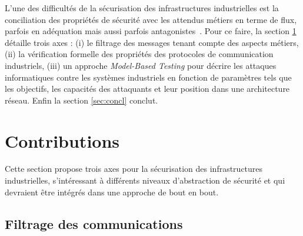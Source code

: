 \documentclass{article}
\begin{document}
L'une des difficultés de la sécurisation des infrastructures industrielles est la
conciliation des propriétés de sécurité avec les attendus métiers en terme de
flux, parfois en adéquation mais aussi parfois antagonistes~\cite{Pie10}.
Pour ce faire, la section \ref{sec:contribs} détaille trois axes :
(i) le filtrage des messages tenant compte des aspects métiers, (ii) la
vérification formelle des propriétés des protocoles de communication industriels,
(iii) un approche {\em Model-Based Testing} pour décrire les attaques
informatiques contre les systèmes industriels en fonction de paramètres tels que
les objectifs, les capacités des attaquants et leur position dans une
architecture réseau.
Enfin la section \ref{sec:concl} conclut.

\section{Contributions}\label{sec:contribs}

Cette section propose trois axes pour la sécurisation des infrastructures
industrielles, s'intéressant à différents niveaux d'abstraction de sécurité
et qui devraient être intégrés dans une approche de bout en bout.

\subsection{Filtrage des communications}\label{sec:aramis}
\end{document}
